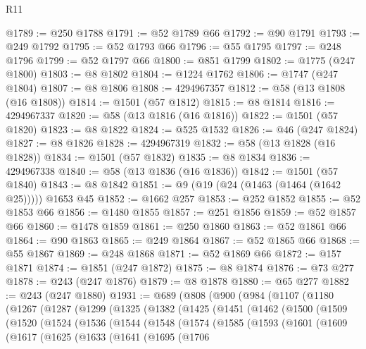 \begin{lexlean}{R11}
\begin{coremodule}
@1789 := @250 @1788
@1791 := @52 @1789 @66
@1792 := @90 @1791
@1793 := @249 @1792
@1795 := @52 @1793 @66
@1796 := @55 @1795
@1797 := @248 @1796
@1799 := @52 @1797 @66
@1800 := @851 @1799
@1802 := @1775 (@247 @1800)
@1803 := @8 @1802
@1804 := @1224 @1762
@1806 := @1747 (@247 @1804)
@1807 := @8 @1806
@1808 := 4294967357
@1812 := @58 (@13 @1808 (@16 @1808))
@1814 := @1501 (@57 @1812)
@1815 := @8 @1814
@1816 := 4294967337
@1820 := @58 (@13 @1816 (@16 @1816))
@1822 := @1501 (@57 @1820)
@1823 := @8 @1822
@1824 := @525 @1532
@1826 := @46 (@247 @1824)
@1827 := @8 @1826
@1828 := 4294967319
@1832 := @58 (@13 @1828 (@16 @1828))
@1834 := @1501 (@57 @1832)
@1835 := @8 @1834
@1836 := 4294967338
@1840 := @58 (@13 @1836 (@16 @1836))
@1842 := @1501 (@57 @1840)
@1843 := @8 @1842
@1851 := @9 (@19 (@24 (@1463 (@1464 (@1642 @25))))) @1653 @45
@1852 := @1662 @257
@1853 := @252 @1852
@1855 := @52 @1853 @66
@1856 := @1480 @1855
@1857 := @251 @1856
@1859 := @52 @1857 @66
@1860 := @1478 @1859
@1861 := @250 @1860
@1863 := @52 @1861 @66
@1864 := @90 @1863
@1865 := @249 @1864
@1867 := @52 @1865 @66
@1868 := @55 @1867
@1869 := @248 @1868
@1871 := @52 @1869 @66
@1872 := @157 @1871
@1874 := @1851 (@247 @1872)
@1875 := @8 @1874
@1876 := @73 @277
@1878 := @243 (@247 @1876)
@1879 := @8 @1878
@1880 := @65 @277
@1882 := @243 (@247 @1880)
@1931 := @689
    (@808
      (@900
        (@984
          (@1107
            (@1180
              (@1267
                (@1287
                  (@1299
                    (@1325
                      (@1382
                        (@1425
                          (@1451
                            (@1462
                              (@1500
                                (@1509
                                  (@1520
                                    (@1524
                                      (@1536
                                        (@1544
                                          (@1548
                                            (@1574
                                              (@1585
                                                (@1593
                                                  (@1601
                                                    (@1609
                                                      (@1617
                                                        (@1625
                                                          (@1633
                                                            (@1641
                                                              (@1695
                                                                (@1706

\end{coremodule}
\end{lexlean}
